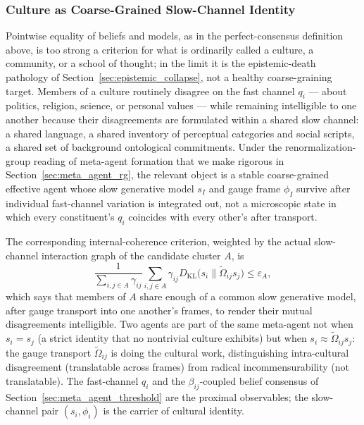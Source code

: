 \documentclass[11pt]{article}
\begin{document}
\subsubsection{Culture as Coarse-Grained Slow-Channel Identity}
\label{sec:culture_rg}

Pointwise equality of beliefs and models, as in the perfect-consensus definition above, is too strong a criterion for what is ordinarily called a culture, a community, or a school of thought; in the limit it is the epistemic-death pathology of Section~\ref{sec:epistemic_collapse}, not a healthy coarse-graining target. Members of a culture routinely disagree on the fast channel $q_i$ — about politics, religion, science, or personal values — while remaining intelligible to one another because their disagreements are formulated within a shared slow channel: a shared language, a shared inventory of perceptual categories and social scripts, a shared set of background ontological commitments. Under the renormalization-group reading of meta-agent formation that we make rigorous in Section~\ref{sec:meta_agent_rg}, the relevant object is a stable coarse-grained effective agent whose slow generative model $s_I$ and gauge frame $\phi_I$ survive after individual fast-channel variation is integrated out, not a microscopic state in which every constituent's $q_i$ coincides with every other's after transport.

The corresponding internal-coherence criterion, weighted by the actual slow-channel interaction graph of the candidate cluster $A$, is
\begin{equation}
\frac{1}{\sum_{i,j \in A}\gamma_{ij}}\sum_{i,j \in A}\gamma_{ij} D_{\mathrm{KL}}\big(s_i \big\| \tilde\Omega_{ij} s_j\big) \le \varepsilon_A,
\label{eq:culture_internal_coherence}
\end{equation}
which says that members of $A$ share enough of a common slow generative model, after gauge transport into one another's frames, to render their mutual disagreements intelligible. Two agents are part of the same meta-agent not when $s_i = s_j$ (a strict identity that no nontrivial culture exhibits) but when $s_i \approx \tilde\Omega_{ij} s_j$: the gauge transport $\tilde\Omega_{ij}$ is doing the cultural work, distinguishing intra-cultural disagreement (translatable across frames) from radical incommensurability (not translatable). The fast-channel $q_i$ and the $\beta_{ij}$-coupled belief consensus of Section~\ref{sec:meta_agent_threshold} are the proximal observables; the slow-channel pair $(s_i, \phi_i)$ is the carrier of cultural identity.
\end{document}
